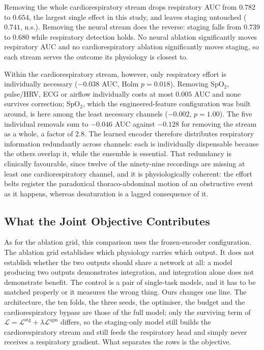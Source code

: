 \documentclass{ieeeaccess}
\newcommand{\fzAcc}{0.739}
\newcommand{\fzAuc}{0.782}
\begin{document}
Removing the whole cardiorespiratory stream drops respiratory AUC from $\fzAuc$ to $0.654$,
the largest single effect in this study, and leaves staging untouched ($0.741$, n.s.).
Removing the neural stream does the reverse: staging falls from $\fzAcc$ to $0.680$ while
respiratory detection holds. No neural ablation significantly moves respiratory AUC and no
cardiorespiratory ablation significantly moves staging, so each stream serves the outcome its physiology is closest to.

Within the cardiorespiratory stream, however, only respiratory effort is individually necessary
($-0.038$ AUC, Holm $p=0.018$). Removing SpO$_2$, pulse/HRV, ECG or airflow individually costs
at most $0.005$ AUC and none survives correction; SpO$_2$, which the engineered-feature
configuration was built around, is here among the least necessary channels
($-0.002$, $p=1.00$). The five
individual removals sum to $-0.046$ AUC against $-0.128$ for removing the stream as a whole,
a factor of $2.8$. The learned encoder therefore distributes respiratory information redundantly
across channels: each is individually dispensable because the others overlap it, while the
ensemble is essential. That redundancy is clinically favourable, since
twelve of the ninety-nine recordings are missing at least one cardiorespiratory channel, and it is
physiologically coherent: the effort belts register the paradoxical thoraco-abdominal motion
of an obstructive event as it happens, whereas desaturation is a lagged consequence of it.

\subsection{What the Joint Objective Contributes}
\label{sec:joint}
As for the ablation grid, this comparison uses the frozen-encoder configuration. The ablation
grid establishes which physiology carries which output. It does not establish
whether the two outputs should share a network at all: a
model producing two outputs demonstrates integration, and integration alone does not
demonstrate benefit. The control is a
pair of single-task models, and it has to be matched properly or it measures the wrong
thing. Ours changes one line. The architecture, the ten folds, the three seeds, the
optimiser, the budget and the cardiorespiratory bypass are those of the full model; only the
surviving term of $\mathcal{L}=\mathcal{L}^{\mathrm{stg}}+\lambda\mathcal{L}^{\mathrm{apn}}$
differs, so the staging-only model still builds the cardiorespiratory stream and still feeds
the respiratory head and simply never receives a respiratory gradient. What separates the
rows is the objective.
\end{document}

